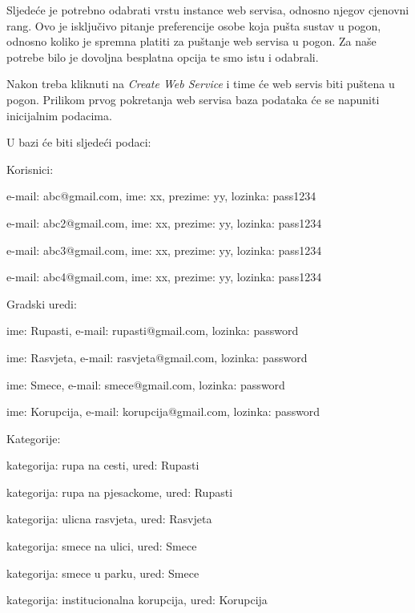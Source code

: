 			Sljedeće je potrebno odabrati vrstu instance web servisa, odnosno njegov cjenovni rang. Ovo je isključivo pitanje preferencije osobe koja pušta sustav u pogon, odnosno koliko je spremna platiti za puštanje web servisa u pogon. Za naše potrebe bilo je dovoljna besplatna opcija te smo istu i odabrali.
			
			Nakon treba kliknuti na \textit{Create Web Service} i time će web servis biti puštena u pogon. Prilikom prvog pokretanja web servisa baza podataka će se napuniti inicijalnim podacima.
			
			U bazi će biti sljedeći podaci:
			\begin{packed_item}
				\item Korisnici:
				\begin{packed_item}
					\item e-mail: abc@gmail.com, ime: xx, prezime: yy, lozinka: pass1234
					\item e-mail: abc2@gmail.com, ime: xx, prezime: yy, lozinka: pass1234
					\item e-mail: abc3@gmail.com, ime: xx, prezime: yy, lozinka: pass1234
					\item e-mail: abc4@gmail.com, ime: xx, prezime: yy, lozinka: pass1234
				\end{packed_item}
				\item Gradski uredi:
				\begin{packed_item}
					\item ime: Rupasti, e-mail: rupasti@gmail.com, lozinka: password
					\item ime: Rasvjeta, e-mail: rasvjeta@gmail.com, lozinka: password
					\item ime: Smece, e-mail: smece@gmail.com, lozinka: password
					\item ime: Korupcija, e-mail: korupcija@gmail.com, lozinka: password
				\end{packed_item}
				\item Kategorije:
				\begin{packed_item}
					\item kategorija: rupa na cesti, ured: Rupasti
					\item kategorija: rupa na pjesackome, ured: Rupasti
					\item kategorija: ulicna rasvjeta, ured: Rasvjeta
					\item kategorija: smece na ulici, ured: Smece
					\item kategorija: smece u parku, ured: Smece
					\item kategorija: institucionalna korupcija, ured: Korupcija

\end{packed_item}
\end{packed_item}
